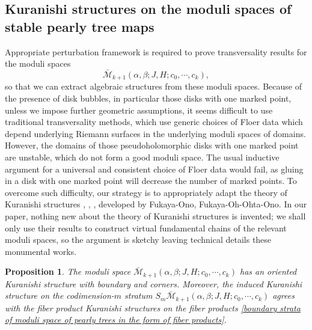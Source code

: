 \documentclass{amsart}
\newtheorem{proposition}[theorem]{Proposition}
\numberwithin{equation}{section}
\numberwithin{figure}{section}
\begin{document}
\subsection{Kuranishi structures on the moduli spaces of stable pearly tree maps} \label{section: Kuranishi structure on moduli spaces of stable pearly tree maps}

	Appropriate perturbation framework is required to prove transversality results for the moduli spaces 
\begin{equation*}
\bar{\mathcal{M}}_{k+1}(\alpha, \beta; J, H; c_{0}, \cdots, c_{k}),
\end{equation*}
so that we can extract algebraic structures from these moduli spaces. Because of the presence of disk bubbles, in particular those disks with one marked point, unless we impose further geometric assumptions, it seems difficult to use traditional transversality methods, which use generic choices of Floer data which depend underlying Riemann surfaces in the underlying moduli spaces of domains. However, the domains of those pseudoholomorphic disks with one marked point are unstable, which do not form a good moduli space. The usual inductive argument for a universal and consistent choice of Floer data would fail, as gluing in a disk with one marked point will decrease the number of marked points.
To overcome such difficulty, our strategy is to appropriately adapt the theory of Kuranishi structures \cite{Fukaya-Ono} \cite{FOOO1}, \cite{FOOO2}, \cite{FOOO3}, \cite{FOOO4} developed by Fukaya-Ono, Fukaya-Oh-Ohta-Ono. In our paper, nothing new about the theory of Kuranishi structures is invented; we shall only use their results to construct virtual fundamental chains of the relevant moduli spaces, so the argument is sketchy leaving technical details these monumental works. \par

\begin{proposition}\label{Kuranishi structure on the moduli space of pearly trees}
	The moduli space $\bar{\mathcal{M}}_{k+1}(\alpha, \beta; J, H; c_{0}, \cdots, c_{k})$ has an oriented Kuranishi structure with boundary and corners. Moreover, the induced Kuranishi structure on the codimension-$m$ stratum $S_{m}\bar{\mathcal{M}}_{k+1}(\alpha, \beta; J, H; c_{0}, \cdots, c_{k})$ agrees with the fiber product Kuranishi structures on the fiber products \eqref{boundary strata of moduli space of pearly trees in the form of fiber products}.
\end{proposition}
\end{document}
